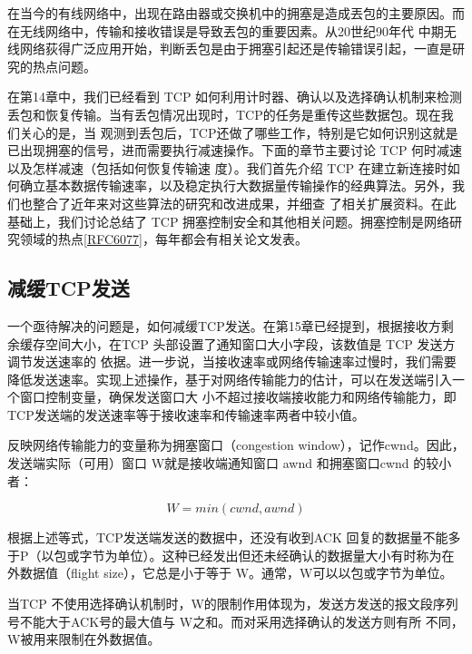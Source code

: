 \begin{tcolorbox}
    在当今的有线网络中，出现在路由器或交换机中的拥塞是造成丟包的主要原因。而在无线网络中，传输和接收错误是导致丟包的重要因素。从20世纪90年代
    中期无线网络荻得广泛应用开始，判断丢包是由于拥塞引起还是传输错误引起，一直是研究的热点问题。
\end{tcolorbox}

在第14章中，我们已经看到 TCP 如何利用计时器、确认以及选择确认机制来检测丢包和恢复传输。当有丢包情况出现时，TCP的任务是重传这些数据包。现在我们关心的是，当
观测到丢包后，TCP还做了哪些工作，特别是它如何识别这就是已出现拥塞的信号，进而需要执行减速操作。下面的章节主要讨论 TCP 何时减速以及怎样减速（包括如何恢复传输速
度）。我们首先介绍 TCP 在建立新连接时如何确立基本数据传输速率，以及稳定执行大数据量传输操作的经典算法。另外，我们也整合了近年来对这些算法的研究和改进成果，并细查
了相关扩展资料。在此基础上，我们讨论总结了 TCP 拥塞控制安全和其他相关问题。拥塞控制是网络研究领域的热点\href{https://www.rfc-editor.org/rfc/rfc6077}{[RFC6077]}，每年都会有相关论文发表。

\subsection{减缓TCP发送}
一个亟待解决的问题是，如何减缓TCP发送。在第15章已经提到，根据接收方剩余缓存空间大小，在TCP 头部设置了通知窗口大小字段，该数值是 TCP 发送方调节发送速率的
依据。进一步说，当接收速率或网络传输速率过慢时，我们需要降低发送速率。实现上述操作，基于对网络传输能力的估计，可以在发送端引入一个窗口控制变量，确保发送窗口大
小不超过接收端接收能力和网络传输能力，即TCP发送端的发送速率等于接收速率和传输速率两者中较小值。

反映网络传输能力的变量称为拥塞窗口（congestion window），记作cwnd。因此，发送端实际（可用）窗口 W就是接收端通知窗口 awnd 和拥塞窗口cwnd 的较小者：

\begin{equation}
    W = min (cwnd, awnd)
\end{equation}

根据上述等式，TCP发送端发送的数据中，还没有收到ACK 回复的数据量不能多于P（以包或字节为单位）。这种已经发出但还未经确认的数据量大小有时称为在外数据值（flight
size），它总是小于等于 W。通常，W可以以包或字节为单位。

\begin{tcolorbox}
    当TCP 不使用选择确认机制时，W的限制作用体现为，发送方发送的报文段序列号不能大于ACK号的最大值与 W之和。而对采用选择确认的发送方则有所
    不同，W被用来限制在外数据值。
\end{tcolorbox}

